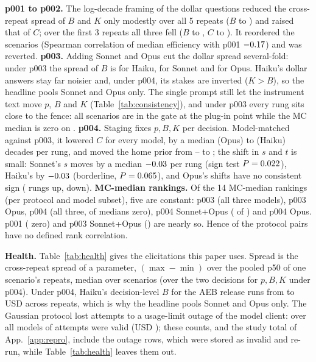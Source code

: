\documentclass{article}
\begin{document}
\textbf{p001 to p002.} The log-decade framing of the dollar questions reduced the cross-repeat spread of $B$ and $K$ only modestly over all 5 repeats ($B$ \voibaseNoiseB{} to \twPtwoNoiseB) and raised that of $C$; over the first 3 repeats all three fell ($B$ \twPoneNoiseBThree{} to \twPtwoNoiseBThree, $C$ \twPoneNoiseCThree{} to \twPtwoNoiseCThree). It reordered the scenarios (Spearman correlation of median efficiency with p001 $-0.17$) and was reverted. \textbf{p003.} Adding Sonnet and Opus cut the dollar spread several-fold: under p003 the spread of $B$ is \twNoiseBHaiku{} for Haiku, \twNoiseBSonnet{} for Sonnet and \twNoiseBOpus{} for Opus. Haiku's dollar answers stay far noisier and, under p004, its stakes are inverted ($K>B$), so the headline pools Sonnet and Opus only. The single prompt still let the instrument text move $p$, $B$ and $K$ (Table~\ref{tab:consistency}), and under p003 every rung sits close to the fence: all \voisinglePluginInGate{} scenarios are in the gate at the plug-in point while the MC median is zero on \voisingleMcZeroMedian. \textbf{p004.} Staging fixes $p,B,K$ per decision. Model-matched against p003, it lowered $C$ for every model, by a median \twCDropOpus{} (Opus) to \twCDropHaiku{} (Haiku) decades per rung, and moved the home prior from \twHomePSingleLo--\twHomePSingleHi{} to \twHomeP; the shift in $s$ and $t$ is small: Sonnet's $s$ moves by a median $-0.03$ per rung (sign test $P=0.022$), Haiku's by $-0.03$ (borderline, $P=0.065$), and Opus's shifts have no consistent sign (\twOpusShiftUp{} rungs up, \twOpusShiftDown{} down). \textbf{MC-median rankings.} Of the 14 MC-median rankings (per protocol and model subset), five are constant: p003 (all three models), p003 Opus, p004 (all three, \voiallmMcZeroMedian{} of \voiNScenarios{} medians zero), p004 Sonnet+Opus (\voiMcZeroMedian{} of \voiNScenarios) and p004 Opus. p001 (\voibaseMcZeroMedian{} zero) and p003 Sonnet+Opus (\voisingleMcZeroMedian) are nearly so. Hence \twNaPairs{} of the \twAllPairs{} protocol pairs have no defined rank correlation.

\textbf{Health.} Table~\ref{tab:health} gives the elicitations this paper uses. Spread is the cross-repeat spread of a parameter, $(\max-\min)$ over the pooled p50 of one scenario's repeats, median over scenarios (over the two decisions for $p,B,K$ under p004). Under p004, Haiku's decision-level $B$ for the AEB release runs from \twHaikuAebBLo{} to \twHaikuAebBHi{} USD across \voiMemberKA{} repeats, which is why the headline pools Sonnet and Opus only. The Gaussian protocol lost attempts to a usage-limit outage of the model client: over all models \twGaussValid{} of \twGaussAttempts{} attempts were valid (USD \twGaussUSD); these counts, and the study total of App.~\ref{app:repro}, include the outage rows, which were stored as invalid and re-run, while Table~\ref{tab:health} leaves them out.
\end{document}
